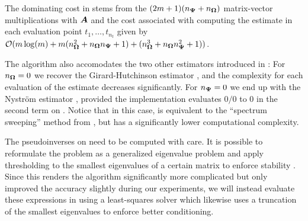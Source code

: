 The dominating cost in  stems from the $(2m + 1)(n_{\boldsymbol{\Psi}} + n_{\boldsymbol{\Omega}})$ matrix-vector multiplications with $\boldsymbol{A}$ and the cost associated with computing the estimate in each evaluation point $t_1, \dots, t_{n_t}$ given by $\mathcal{O}(m \log(m) + m (n_{\boldsymbol{\Omega}}^2 + n_{\boldsymbol{\Omega}} n_{\boldsymbol{\Psi}} + 1) + (n_{\boldsymbol{\Omega}}^3 + n_{\boldsymbol{\Omega}} n_{\boldsymbol{\Psi}}^2 + 1))$.

The algorithm also accomodates the two other estimators introduced in : For $n_{\boldsymbol{\Omega}} = 0$ we recover the Girard-Hutchinson estimator , and the complexity for each evaluation of the estimate decreases significantly. For $n_{\boldsymbol{\Psi}} = 0$ we end up with the Nyström estimator , provided the implementation evaluates $0/0$ to $0$ in the second term on . Notice that in this case,  is equivalent to the \enquote{spectrum sweeping} method from \cite[Algorithm 5]{lin-2017-randomized-estimation}, but has a significantly lower computational complexity.




The pseudoinverses on  need to be computed with care. It is possible to reformulate the problem as a generalized eigenvalue problem and apply thresholding to the smallest eigenvalues of a certain matrix to enforce stability \cite{lin-2017-randomized-estimation, epperly-2022-theory-quantum}. Since this renders the algorithm significantly more complicated but only improved the accuracy slightly during our experiments, we will instead evaluate these expressions in  using a least-squares solver which likewise uses a truncation of the smallest eigenvalues to enforce better conditioning.


